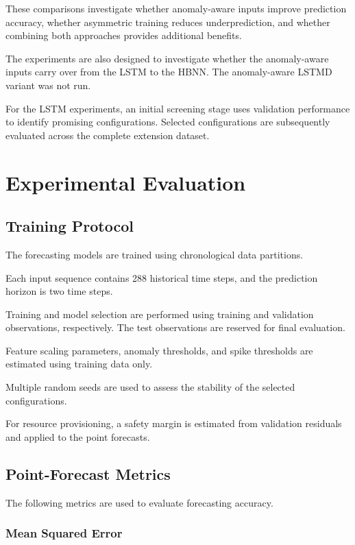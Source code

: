 \documentclass[conference]{IEEEtran}
\begin{document}
These comparisons investigate whether anomaly-aware inputs improve prediction accuracy, whether asymmetric training reduces underprediction, and whether combining both approaches provides additional benefits.

The experiments are also designed to investigate whether the anomaly-aware inputs carry over from the LSTM to the HBNN. The anomaly-aware LSTMD variant was not run.

For the LSTM experiments, an initial screening stage uses validation performance to identify promising configurations. Selected configurations are subsequently evaluated across the complete extension dataset.

\section{Experimental Evaluation}

\subsection{Training Protocol}

The forecasting models are trained using chronological data partitions.

Each input sequence contains 288 historical time steps, and the prediction horizon is two time steps.

Training and model selection are performed using training and validation observations, respectively. The test observations are reserved for final evaluation.

Feature scaling parameters, anomaly thresholds, and spike thresholds are estimated using training data only.

Multiple random seeds are used to assess the stability of the selected configurations.

For resource provisioning, a safety margin is estimated from validation residuals and applied to the point forecasts.

\subsection{Point-Forecast Metrics}

The following metrics are used to evaluate forecasting accuracy.

\subsubsection{Mean Squared Error}
\end{document}
